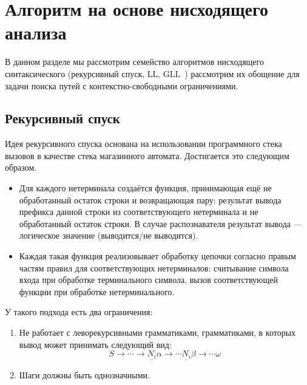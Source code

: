 \chapter{Алгоритм на основе нисходящего анализа}

В данном разделе мы рассмотрим семейство алгоритмов нисходящего синтаксического (рекурсивный спуск, LL, GLL~\cite{Scott:2010:GP:1860132.1860320,10.1007/978-3-662-46663-6_5}) рассмотрим их обощение для задачи поиска путей с контекстно-свободными ограничениями.


\section{Рекурсивный спуск}

Идея рекурсивного спуска основана на использовании программного стека вызовов в качестве стека магазинного автомата. Достигается это следующим образом.
\begin{itemize}
  \item Для каждого нетерминала создаётся функция, принимающая ещё не обработанный остаток строки и возвращающая пару: результат вывода префикса данной строки из соответствующего нетерминала и не обработанный остаток строки. В случае распознавателя результат вывода --- логическое значение (выводится/не выводится).
  \item Каждая такая функция реализовывает обработку цепочки согласно правым частям правил для соответствующих нетерминалов: считывание символа входа при обработке терминального символа, вызов соответствующей функции при обработке нетерминального.
\end{itemize}

У такого подхода есть два ограничения:
\begin{enumerate}
  \item Не работает с леворекурсивными грамматиками, грамматиками, в которых вывод может принимать следующий вид:
  $$
  S \to \cdots \to \underline{N_i} \alpha \to \cdots \underline{N_i} \beta \to \cdots \omega
  $$
  \item Шаги должны быть однозначными.
\end{enumerate}

